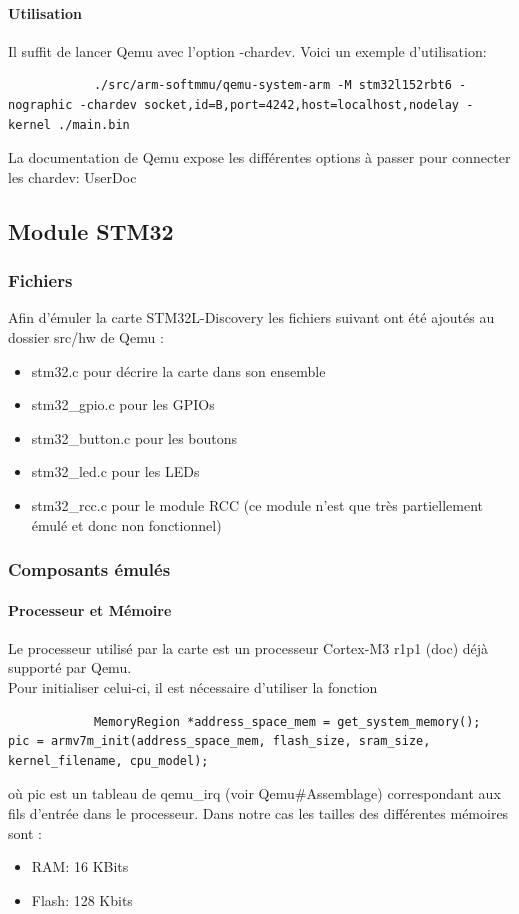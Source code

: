 \documentclass{article}
\begin{document}
			\paragraph{Utilisation \\}
			Il suffit de lancer Qemu avec l'option -chardev. Voici un exemple d'utilisation: 
			\begin{verbatim}
			./src/arm-softmmu/qemu-system-arm -M stm32l152rbt6 -nographic -chardev socket,id=B,port=4242,host=localhost,nodelay -kernel ./main.bin
			\end{verbatim}
			La documentation de Qemu expose les différentes options à passer pour connecter les chardev: UserDoc

			
			
	\subsection{Module STM32}
		\subsubsection{Fichiers}
			Afin d'émuler la carte STM32L-Discovery les fichiers suivant ont été ajoutés au dossier src/hw de Qemu : 
			\begin{itemize}
				\item stm32.c pour décrire la carte dans son ensemble
				\item stm32\_gpio.c pour les GPIOs
				\item stm32\_button.c pour les boutons
				\item stm32\_led.c pour les LEDs
				\item stm32\_rcc.c pour le module RCC (ce module n'est que très partiellement émulé et donc non fonctionnel) 
			\end{itemize}
		
		\subsubsection{Composants émulés}
			\paragraph{Processeur et Mémoire \\}
			Le processeur utilisé par la carte est un processeur Cortex-M3 r1p1 (doc) déjà supporté par Qemu.\\
			Pour initialiser celui-ci, il est nécessaire d'utiliser la fonction 
			\begin{verbatim}
			MemoryRegion *address_space_mem = get_system_memory();
pic = armv7m_init(address_space_mem, flash_size, sram_size, kernel_filename, cpu_model);
			\end{verbatim}
			où pic est un tableau de qemu\_irq (voir Qemu\#Assemblage) correspondant aux fils d'entrée dans
			le processeur. Dans notre cas les tailles des différentes mémoires sont : 
			\begin{itemize}
				\item RAM: 16 KBits 
				\item Flash: 128 Kbits
			\end{itemize}
			
\end{document}
